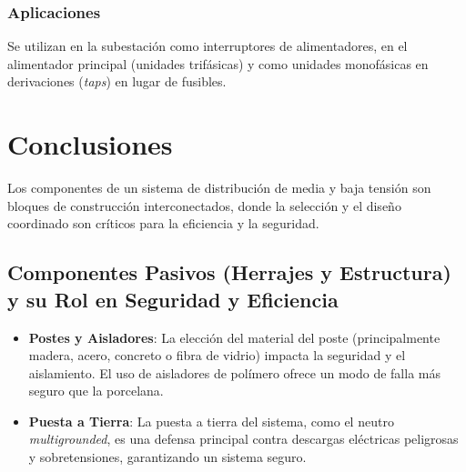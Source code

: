 \subsubsection*{Aplicaciones}
Se utilizan en la subestación como interruptores de alimentadores, en el alimentador principal (unidades trifásicas) y como unidades monofásicas en derivaciones (\textit{taps}) en lugar de fusibles.

\section*{Conclusiones}

Los componentes de un sistema de distribución de media y baja tensión son bloques de construcción interconectados, donde la selección y el diseño coordinado son críticos para la eficiencia y la seguridad.

\subsection*{Componentes Pasivos (Herrajes y Estructura) y su Rol en Seguridad y Eficiencia}
\begin{itemize}
    \item \textbf{Postes y Aisladores}: La elección del material del poste (principalmente madera, acero, concreto o fibra de vidrio) impacta la seguridad y el aislamiento. El uso de aisladores de polímero ofrece un modo de falla más seguro que la porcelana.
    \item \textbf{Puesta a Tierra}: La puesta a tierra del sistema, como el neutro \textit{multigrounded}, es una defensa principal contra descargas eléctricas peligrosas y sobretensiones, garantizando un sistema seguro.
\end{itemize}

